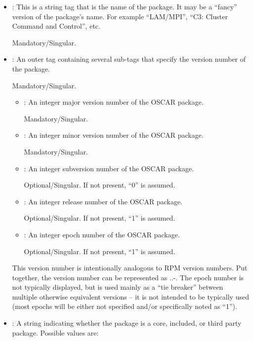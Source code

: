 \begin{itemize}
\item {}: This is a string tag that is the name of the
  package.  It may be a ``fancy'' version of the package's name.  For
  example ``LAM/MPI'', ``C3: Cluster Command and Control'', etc.

  Mandatory/Singular.
  
\item {}: An outer tag containing several sub-tags that
  specify the version number of the package.

  Mandatory/Singular.
  
  \begin{itemize}
  \item {}: An integer major version number of
    the OSCAR package.

    Mandatory/Singular.
    
  \item {}: An integer minor version number of the OSCAR
    package.

    Mandatory/Singular.
    
  \item {}: An integer subversion number of the OSCAR
    package.
    
    Optional/Singular.  If not present, ``0'' is assumed.
    
  \item {}: An integer release number of the OSCAR
    package.
    
    Optional/Singular.  If not present, ``1'' is assumed.
    
  \item {}: An integer epoch number of the OSCAR package.
    
    Optional/Singular.  If not present, ``1'' is assumed.
  \end{itemize}
  
  This version number is intentionally analogous to RPM version numbers.
  Put together, the version number can be represented as
  ..-.
  The epoch number is not typically displayed, but is used mainly as a
  ``tie breaker'' between multiple otherwise equivalent versions -- it
  is not intended to be typically used (most epochs will be either not
  specified and/or specifically noted as ``1'').
  
\item {}: A string indicating whether the package is a
  core, included, or third party package.  Possible values are:


\end{itemize}
